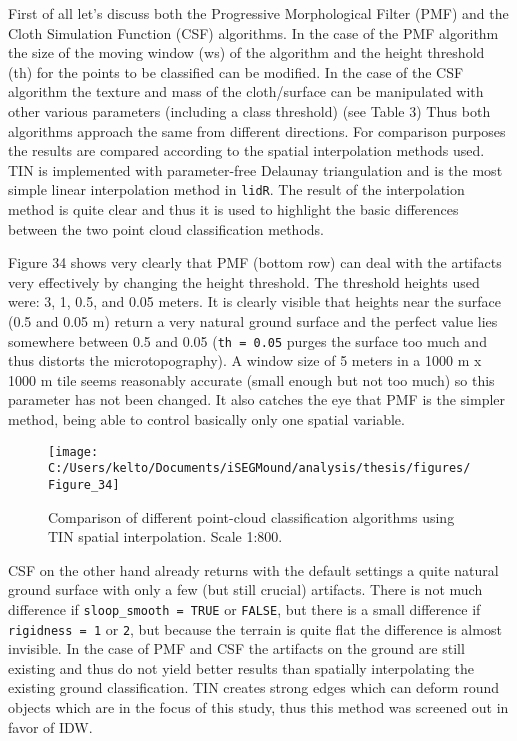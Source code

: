 \documentclass[
  12pt,
]{article}
\begin{document}
First of all let's discuss both the Progressive Morphological Filter (PMF) and the Cloth Simulation Function (CSF) algorithms. In the case of the PMF algorithm the size of the moving window (ws) of the algorithm and the height threshold (th) for the points to be classified can be modified. In the case of the CSF algorithm the texture and mass of the cloth/surface can be manipulated with other various parameters (including a class threshold) (see Table 3) Thus both algorithms approach the same from different directions.
For comparison purposes the results are compared according to the spatial interpolation methods used. TIN is implemented with parameter-free Delaunay triangulation and is the most simple linear interpolation method in \texttt{lidR}. The result of the interpolation method is quite clear and thus it is used to highlight the basic differences between the two point cloud classification methods.

Figure 34 shows very clearly that PMF (bottom row) can deal with the artifacts very effectively by changing the height threshold. The threshold heights used were: 3, 1, 0.5, and 0.05 meters. It is clearly visible that heights near the surface (0.5 and 0.05 m) return a very natural ground surface and the perfect value lies somewhere between 0.5 and 0.05 (\texttt{th\ =\ 0.05} purges the surface too much and thus distorts the microtopography). A window size of 5 meters in a 1000 m x 1000 m tile seems reasonably accurate (small enough but not too much) so this parameter has not been changed. It also catches the eye that PMF is the simpler method, being able to control basically only one spatial variable.

\begin{figure}

{\centering \texttt{[image: C:/Users/kelto/Documents/iSEGMound/analysis/thesis/figures/Figure\_34]} 

}

\caption{Comparison of different point-cloud classification algorithms using TIN spatial interpolation. Scale 1:800.}\label{fig:Figure34}
\end{figure}

CSF on the other hand already returns with the default settings a quite natural ground surface with only a few (but still crucial) artifacts. There is not much difference if \texttt{sloop\_smooth\ =\ TRUE} or \texttt{FALSE}, but there is a small difference if \texttt{rigidness\ =\ 1} or \texttt{2}, but because the terrain is quite flat the difference is almost invisible.
In the case of PMF and CSF the artifacts on the ground are still existing and thus do not yield better results than spatially interpolating the existing ground classification.
TIN creates strong edges which can deform round objects which are in the focus of this study, thus this method was screened out in favor of IDW.
\end{document}
